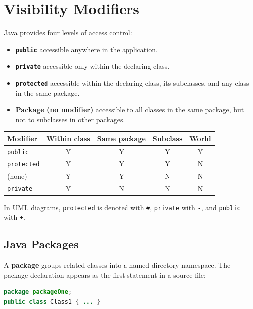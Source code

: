 \documentclass[11pt, a4paper, notitlepage]{report}
\theoremstyle{definition}
\theoremstyle{remark}
\theoremstyle{definition}
\begin{document}
%
\section{Visibility Modifiers}
\label{sec:ch3-visibility}

Java provides four levels of access control:

\begin{itemize}
    \item \textbf{\texttt{public}}  accessible anywhere in the application.
    \item \textbf{\texttt{private}}  accessible only within the declaring class.
    \item \textbf{\texttt{protected}}  accessible within the declaring class, its subclasses, and any class in the same package.
    \item \textbf{Package (no modifier)}  accessible to all classes in the same package, but not to subclasses in other packages.
\end{itemize}

\begin{center}
\begin{tabular}{lcccc}
\hline
\textbf{Modifier} & \textbf{Within class} & \textbf{Same package} & \textbf{Subclass} & \textbf{World} \\
\hline
\texttt{public}    & Y & Y & Y & Y \\
\texttt{protected} & Y & Y & Y & N \\
(none)             & Y & Y & N & N \\
\texttt{private}   & Y & N & N & N \\
\hline
\end{tabular}
\end{center}

In UML diagrams, \texttt{protected} is denoted with \texttt{\#}, \texttt{private} with \texttt{-}, and \texttt{public} with \texttt{+}.

\subsection{Java Packages}
\label{sec:ch3-packages}

A \textbf{package} groups related classes into a named directory namespace. The package declaration appears as the first statement in a source file:

\begin{lstlisting}[language=Java]
package packageOne;
public class Class1 { ... }
\end{lstlisting}
\end{document}
